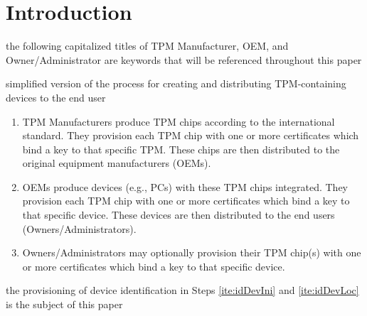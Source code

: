 \chapter{Introduction}



the following capitalized titles of TPM Manufacturer, OEM, and Owner/Administrator are keywords that will be referenced throughout this paper

simplified version of the process for creating and distributing TPM-containing devices to the end user

\begin{enumerate}
  \item\label{ite:idTPM} TPM Manufacturers produce TPM chips according to the international standard. They provision each TPM chip with one or more certificates which bind a key to that specific TPM. These chips are then distributed to the original equipment manufacturers (OEMs).
  \item\label{ite:idDevIni} OEMs produce devices (e.g., PCs) with these TPM chips integrated. They provision each TPM chip with one or more certificates which bind a key to that specific device. These devices are then distributed to the end users (Owners/Administrators).
  \item\label{ite:idDevLoc} Owners/Administrators may optionally provision their TPM chip(s) with one or more certificates which bind a key to that specific device.
\end{enumerate} 

the provisioning of device identification in Steps \ref{ite:idDevIni} and \ref{ite:idDevLoc} is the subject of this paper